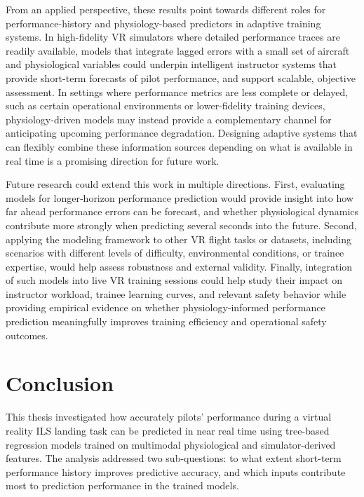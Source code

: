 \documentclass[11pt, a4paper]{article}
\begin{document}
From an applied perspective, these results point towards different roles for performance-history and physiology-based predictors in adaptive training systems. In high-fidelity VR simulators where detailed performance traces are readily available, models that integrate lagged errors with a small set of aircraft and physiological variables could underpin intelligent instructor systems that provide short-term forecasts of pilot performance, and support scalable, objective assessment. In settings where performance metrics are less complete or delayed, such as certain operational environments or lower-fidelity training devices, physiology-driven models may instead provide a complementary channel for anticipating upcoming performance degradation. Designing adaptive systems that can flexibly combine these information sources depending on what is available in real time is a promising direction for future work.

Future research could extend this work in multiple directions. First, evaluating models for longer‑horizon performance prediction would provide insight into how far ahead performance errors can be forecast, and whether physiological dynamics contribute more strongly when predicting several seconds into the future. Second, applying the modeling framework to other VR flight tasks or datasets, including scenarios with different levels of difficulty, environmental conditions, or trainee expertise, would help assess robustness and external validity. Finally, integration of such models into live VR training sessions could help study their impact on instructor workload, trainee learning curves, and relevant safety behavior while providing empirical evidence on whether physiology‑informed performance prediction meaningfully improves training efficiency and operational safety outcomes.


\section{Conclusion}
This thesis investigated how accurately pilots' performance during a virtual reality ILS landing task can be predicted in near real time using tree-based regression models trained on multimodal physiological and simulator-derived features. The analysis addressed two sub-questions: to what extent short-term performance history improves predictive accuracy, and which inputs contribute most to prediction performance in the trained models.
\end{document}

